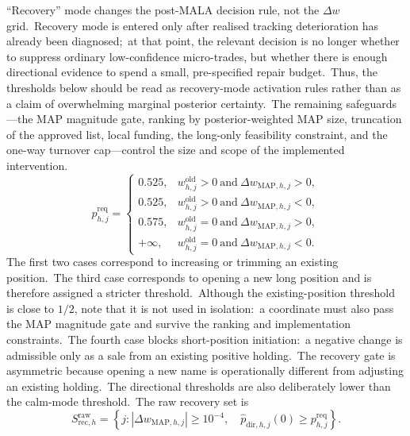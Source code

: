 \documentclass[11pt]{article}
\begin{document}
``Recovery'' mode changes the post-MALA decision rule, not the \(\Delta w\) grid.\ Recovery mode is entered only after realised tracking deterioration has already been diagnosed;\ at that point, the relevant decision is no longer whether to suppress ordinary low-confidence micro-trades, but whether there is enough directional evidence to spend a small, pre-specified repair budget.\ Thus, the thresholds below should be read as recovery-mode activation rules rather than as a claim of overwhelming marginal posterior certainty.\ The remaining safeguards---the MAP magnitude gate, ranking by posterior-weighted MAP size, truncation of the approved list, local funding, the long-only feasibility constraint, and the one-way turnover cap---control the size and scope of the implemented intervention.
\begin{equation}
  p^{\mathrm{req}}_{h,j}
  =
  \begin{cases}
  0.525, & w^{\mathrm{old}}_{h,j}>0\ \text{and}\ \Delta w_{\mathrm{MAP},h,j}>0,\\
  0.525, & w^{\mathrm{old}}_{h,j}>0\ \text{and}\ \Delta w_{\mathrm{MAP},h,j}<0,\\
  0.575, & w^{\mathrm{old}}_{h,j}=0\ \text{and}\ \Delta w_{\mathrm{MAP},h,j}>0,\\
  +\infty, & w^{\mathrm{old}}_{h,j}=0\ \text{and}\ \Delta w_{\mathrm{MAP},h,j}<0.
  \end{cases}
  \label{eq:workflow-recovery-preq}
\end{equation}
The first two cases correspond to increasing or trimming an existing position.\ The third case corresponds to opening a new long position and is therefore assigned a stricter threshold.\ Although the existing-position threshold is close to \(1/2\), note that it is not used in isolation:\ a coordinate must also pass the MAP magnitude gate and survive the ranking and implementation constraints.\ The fourth case blocks short-position initiation:\ a negative change is admissible only as a sale from an existing positive holding.\ The recovery gate is asymmetric because opening a new name is operationally different from adjusting an existing holding.\ The directional thresholds are also deliberately lower than the calm-mode threshold.\ The raw recovery set is
\begin{equation}
  S^{\mathrm{raw}}_{\mathrm{rec},h}
  =
  \left\{
  j:
  |\Delta w_{\mathrm{MAP},h,j}|\geq10^{-4},\quad
  \widehat p_{\mathrm{dir},h,j}(0)\geq p^{\mathrm{req}}_{h,j}
  \right\}.
  \label{eq:workflow-recovery-raw}
\end{equation}
\end{document}
